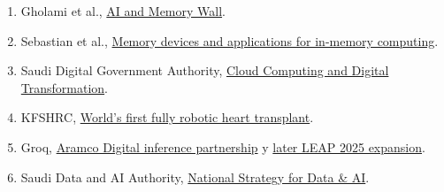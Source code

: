 \documentclass[a4paper]{article}
\begin{document}
\begin{enumerate}
  \item Gholami et al., \href{https://arxiv.org/abs/2403.14123}{AI and Memory Wall}.
  \item Sebastian et al., \href{https://www.nature.com/articles/s41565-020-0655-z}{Memory devices and applications for in-memory computing}.
  \item Saudi Digital Government Authority, \href{https://dga.gov.sa/sites/default/files/2024-08/Cloud%20Computing%20and%20its%20Role%20in%20Accelerating%20Digital%20Transformation%20and%20its%20Sustainable%20Impact%20in%20the%20Government%20Sector%20-%20V1.0.pdf}{Cloud Computing and Digital Transformation}.
  \item KFSHRC, \href{https://www.kfshrc.edu.sa/en/news/2024/09/kfshrc-pioneers-worlds-first-fully-robotic-heart-transplant}{World's first fully robotic heart transplant}.
  \item Groq, \href{https://groq.com/news_press/groq-and-aramco-digital-announce-partnership-to-establish-worlds-largest-inferenc-data-center-in-saudi-arabia}{Aramco Digital inference partnership} y \href{https://groq.com/news_press/saudi-arabia-announces-1-5b-expansion-to-fuel-ai-powered-economy-with-groq}{later LEAP 2025 expansion}.
  \item Saudi Data and AI Authority, \href{https://sdaia.gov.sa/en/SDAIA/about/Pages/Strategy.aspx}{National Strategy for Data \& AI}.
\end{enumerate}
\end{document}
